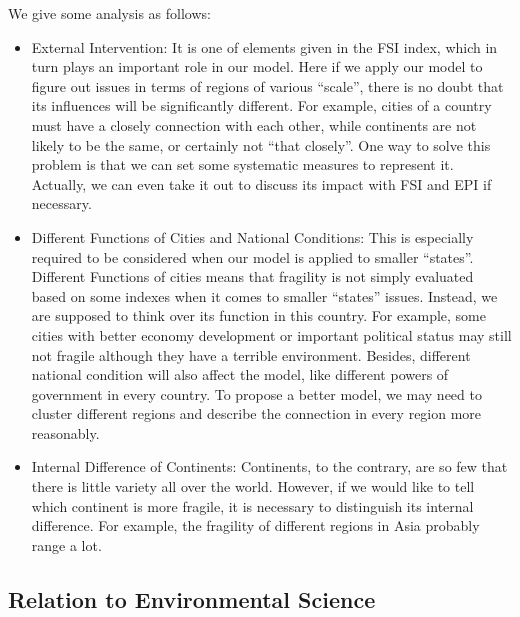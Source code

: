 We give some analysis as follows:
\begin{itemize}
\item	External Intervention: 
It is one of elements given in the FSI index, which in turn plays an important role in our model. Here if we apply our model to figure out issues in terms of regions of various “scale”, there is no doubt that its influences will be significantly different. For example, cities of a country must have a closely connection with each other, while continents are not likely to be the same, or certainly not “that closely”.
One way to solve this problem is that we can set some systematic measures to represent it. Actually, we can even take it out to discuss its impact with FSI and EPI if necessary.
\item	Different Functions of Cities and National Conditions:
This is especially required to be considered when our model is applied to smaller “states”. Different Functions of cities means that fragility is not simply evaluated based on some indexes when it comes to smaller “states” issues. Instead, we are supposed to think over its function in this country. For example, some cities with better economy development or important political status may still not fragile although they have a terrible environment. Besides, different national condition will also affect the model, like different powers of government in every country.
To propose a better model, we may need to cluster different regions and describe the connection in every region more reasonably.
\item	Internal Difference of Continents:
Continents, to the contrary, are so few that there is little variety all over the world. However, if we would like to tell which continent is more fragile, it is necessary to distinguish its internal difference. For example, the fragility of different regions in Asia probably range a lot.
\end{itemize}


\subsection{Relation to Environmental Science}



